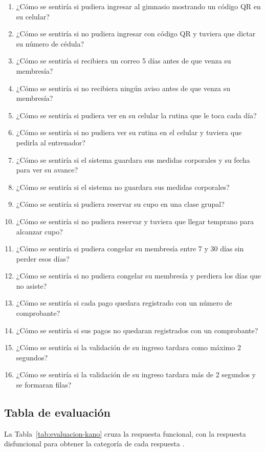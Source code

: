 \begin{enumerate}
\item ¿Cómo se sentiría si pudiera ingresar al gimnasio mostrando un código QR en su celular?
\item ¿Cómo se sentiría si no pudiera ingresar con código QR y tuviera que dictar su número de cédula?
\item ¿Cómo se sentiría si recibiera un correo 5 días antes de que venza su membresía?
\item ¿Cómo se sentiría si no recibiera ningún aviso antes de que venza su membresía?
\item ¿Cómo se sentiría si pudiera ver en su celular la rutina que le toca cada día?
\item ¿Cómo se sentiría si no pudiera ver su rutina en el celular y tuviera que pedirla al entrenador?
\item ¿Cómo se sentiría si el sistema guardara sus medidas corporales y su fecha para ver su avance?
\item ¿Cómo se sentiría si el sistema no guardara sus medidas corporales?
\item ¿Cómo se sentiría si pudiera reservar su cupo en una clase grupal?
\item ¿Cómo se sentiría si no pudiera reservar y tuviera que llegar temprano para alcanzar cupo?
\item ¿Cómo se sentiría si pudiera congelar su membresía entre 7 y 30 días sin perder esos días?
\item ¿Cómo se sentiría si no pudiera congelar su membresía y perdiera los días que no asiste?
\item ¿Cómo se sentiría si cada pago quedara registrado con un número de comprobante?
\item ¿Cómo se sentiría si sus pagos no quedaran registrados con un comprobante?
\item ¿Cómo se sentiría si la validación de su ingreso tardara como máximo 2 segundos?
\item ¿Cómo se sentiría si la validación de su ingreso tardara más de 2 segundos y se formaran filas?
\end{enumerate}

\subsection{Tabla de evaluación}

La Tabla~\ref{tab:evaluacion-kano} cruza la respuesta funcional, con la respuesta disfuncional para obtener la categoría de cada respuesta \cite{kano1984}.

